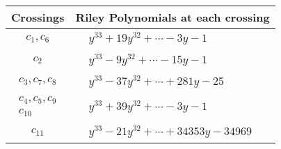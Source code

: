 \documentclass[1p]{elsarticle_modified}
\theoremstyle{definition}
\begin{document}
\begin{tabular}{m{50pt}|m{274pt}}
Crossings & \hspace{64pt}Riley Polynomials at each crossing \\
\hline $$\begin{aligned}c_{1},c_{6}\end{aligned}$$&$\begin{aligned}
&y^{33}+19 y^{32}+\cdots-3 y-1
\end{aligned}$\\
\hline $$\begin{aligned}c_{2}\end{aligned}$$&$\begin{aligned}
&y^{33}-9 y^{32}+\cdots-15 y-1
\end{aligned}$\\
\hline $$\begin{aligned}c_{3},c_{7},c_{8}\end{aligned}$$&$\begin{aligned}
&y^{33}-37 y^{32}+\cdots+281 y-25
\end{aligned}$\\
\hline $$\begin{aligned}c_{4},c_{5},c_{9}\\c_{10}\end{aligned}$$&$\begin{aligned}
&y^{33}+39 y^{32}+\cdots-3 y-1
\end{aligned}$\\
\hline $$\begin{aligned}c_{11}\end{aligned}$$&$\begin{aligned}
&y^{33}-21 y^{32}+\cdots+34353 y-34969
\end{aligned}$\\
\hline
\end{tabular}
\vskip 2pc
\end{document}
